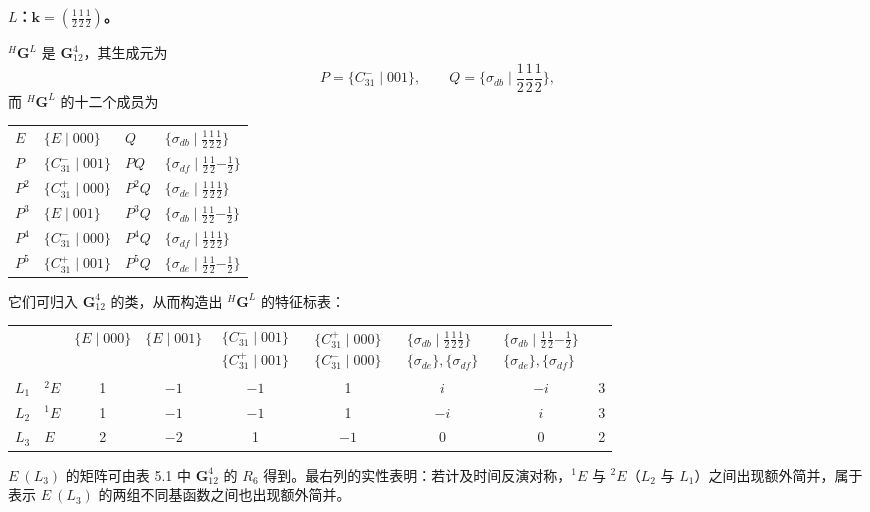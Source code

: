 \noindent\textbf{$L$：$\mathbf{k} = (\frac{1}{2}\frac{1}{2}\frac{1}{2})$。}

${}^{H}\mathbf{G}^{L}$ 是 $\mathbf{G}^{4}_{12}$，其生成元为
\begin{equation*}
P = \{C^{-}_{31} \mid 001\}, \qquad Q = \{\sigma_{db} \mid {\textstyle\frac{1}{2}}{\textstyle\frac{1}{2}}{\textstyle\frac{1}{2}}\},
\end{equation*}
而 ${}^{H}\mathbf{G}^{L}$ 的十二个成员为
\begin{center}
\begin{tabular}{llll}
$E$ & $\{E \mid 000\}$ & $Q$ & $\{\sigma_{db} \mid {\frac{1}{2}}{\frac{1}{2}}{\frac{1}{2}}\}$\\
$P$ & $\{C^{-}_{31} \mid 001\}$ & $PQ$ & $\{\sigma_{df} \mid {\frac{1}{2}}{\frac{1}{2}}{-\frac{1}{2}}\}$\\
$P^{2}$ & $\{C^{+}_{31} \mid 000\}$ & $P^{2}Q$ & $\{\sigma_{de} \mid {\frac{1}{2}}{\frac{1}{2}}{\frac{1}{2}}\}$\\
$P^{3}$ & $\{E \mid 001\}$ & $P^{3}Q$ & $\{\sigma_{db} \mid {\frac{1}{2}}{\frac{1}{2}}{-\frac{1}{2}}\}$\\
$P^{4}$ & $\{C^{-}_{31} \mid 000\}$ & $P^{4}Q$ & $\{\sigma_{df} \mid {\frac{1}{2}}{\frac{1}{2}}{\frac{1}{2}}\}$\\
$P^{5}$ & $\{C^{+}_{31} \mid 001\}$ & $P^{5}Q$ & $\{\sigma_{de} \mid {\frac{1}{2}}{\frac{1}{2}}{-\frac{1}{2}}\}$
\end{tabular}
\end{center}
它们可归入 $\mathbf{G}^{4}_{12}$ 的类，从而构造出 ${}^{H}\mathbf{G}^{L}$ 的特征标表：
\begin{center}
\begin{tabular}{lccccccc}
 & $\{E \mid 000\}$ & $\{E \mid 001\}$ & $\begin{array}{c}\{C^{-}_{31} \mid 001\}\\ \{C^{+}_{31} \mid 001\}\end{array}$ & $\begin{array}{c}\{C^{+}_{31} \mid 000\}\\ \{C^{-}_{31} \mid 000\}\end{array}$ & $\begin{array}{c}\{\sigma_{db} \mid {\frac{1}{2}}{\frac{1}{2}}{\frac{1}{2}}\}\\ \{\sigma_{de}\},\{\sigma_{df}\}\end{array}$ & $\begin{array}{c}\{\sigma_{db} \mid {\frac{1}{2}}{\frac{1}{2}}{-\frac{1}{2}}\}\\ \{\sigma_{de}\},\{\sigma_{df}\}\end{array}$ & \\
$L_{1}$\ \ ${}^{2}E$ & 1 & $-1$ & $-1$ & 1 & $i$ & $-i$ & 3\\
$L_{2}$\ \ ${}^{1}E$ & 1 & $-1$ & $-1$ & 1 & $-i$ & $i$ & 3\\
$L_{3}$\ \ $E$ & 2 & $-2$ & 1 & $-1$ & 0 & 0 & 2
\end{tabular}
\end{center}
$E\ (L_{3})$ 的矩阵可由表 5.1 中 $\mathbf{G}^{4}_{12}$ 的 $R_{6}$ 得到。最右列的实性表明：若计及时间反演对称，${}^{1}E$ 与 ${}^{2}E$（$L_{2}$ 与 $L_{1}$）之间出现额外简并，属于表示 $E\ (L_{3})$ 的两组不同基函数之间也出现额外简并。

